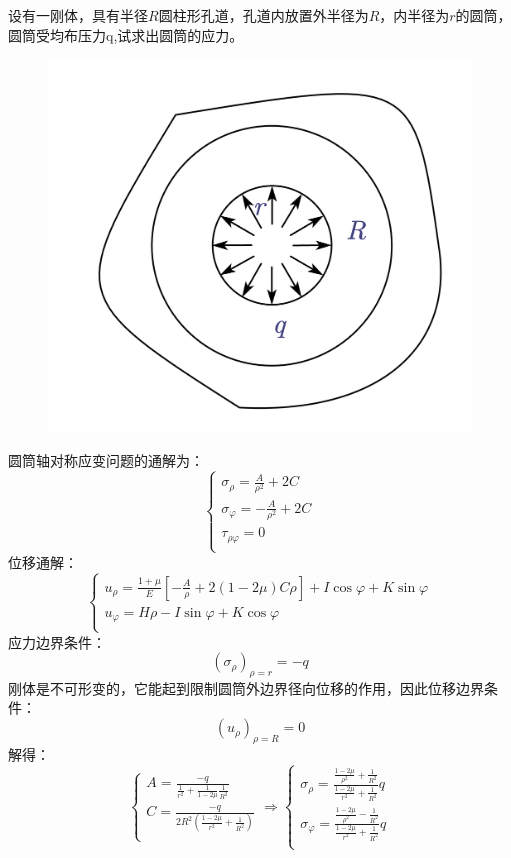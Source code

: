 \begin{example}
设有一刚体，具有半径$R$圆柱形孔道，孔道内放置外半径为$R$，内半径为$r$的圆筒，圆筒受均布压力q,试求出圆筒的应力。
\end{example}
\begin{figure}[!h]
	\centering
	\includegraphics[scale=0.5]{figure/4-8.png}
\end{figure}
	\begin{remark}
		圆筒轴对称应变问题的通解为：
		\[\begin{cases}
		\sigma _{\rho}=\frac{A}{\rho ^2}+2C\\
		\sigma _{\varphi}=-\frac{A}{\rho ^2}+2C\\
		\tau _{\rho \varphi}=0\\
		\end{cases}\]
		位移通解：\[\begin{cases}
		u_{\rho}=\frac{1+\mu}{E}\left[ -\frac{A}{\rho}+2\left( 1-2\mu \right) C\rho \right] +I\cos \varphi +K\sin \varphi\\
		u_{\varphi}=H\rho -I\sin \varphi +K\cos \varphi\\
		\end{cases}\]
		应力边界条件：\[\left( \sigma _{\rho} \right) _{\rho =r}=-q\]
		刚体是不可形变的，它能起到限制圆筒外边界径向位移的作用，因此位移边界条件：\[\left( u_{\rho} \right) _{\rho =R}=0\]
		解得：\[\begin{cases}
		A=\frac{-q}{\frac{1}{r^2}+\frac{1}{1-2\mu}\frac{1}{R^2}}\\
		C=\frac{-q}{2R^2\left( \frac{1-2\mu}{r^2}+\frac{1}{R^2} \right)}\\
		\end{cases}\Longrightarrow \begin{cases}
		\sigma _{\rho}=\frac{\frac{1-2\mu}{\rho ^2}+\frac{1}{R^2}}{\frac{1-2\mu}{r^2}+\frac{1}{R^2}}q\\
		\sigma _{\varphi}=\frac{\frac{1-2\mu}{\rho ^2}-\frac{1}{R^2}}{\frac{1-2\mu}{r^2}+\frac{1}{R^2}}q\\
		\end{cases}\]
	\end{remark}
